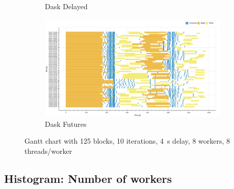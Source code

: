 \documentclass[conference]{IEEEtran}
\begin{document}
\begin{figure}[!htb]
\begin{subfigure}[b]{\columnwidth}
        \caption{Dask Delayed}\label{fig:inc_dask_delayed_gantt}
    \end{subfigure}
    \hfill
    \begin{subfigure}[b]{\columnwidth}
        \includegraphics[clip,width=\columnwidth]{images/futures_inc_gantt.png}%
        \caption{Dask Futures}\label{fig:inc_dask_futures_gantt}
    \end{subfigure}
    \caption{Gantt chart with 125 blocks, 10 iterations, \SI{4}{\second} delay, 8
    workers, 8 threads/worker}\label{fig:inc_gantt}
\end{figure}


\subsection{Histogram: Number of workers}
\end{document}
